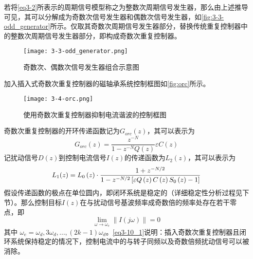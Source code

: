 \documentclass[
  lang=cn,
  degree=master,
  openany,oneside
]{nuaathesis}
\begin{document}
若将\autoref{eq3-2}所表示的周期信号模型称之为整数次周期信号发生器，那么由上述推导可见，其可以分解成为奇数次信号发生器和偶数次信号发生器，如\autoref{fig:3-3-odd_generator}所示。仅取其奇数次周期信号发生器部分，替换传统重复控制器中的整数次周期信号发生器部分，即构成奇数次重复控制器。
\begin{figure}
	\texttt{[image: 3-3-odd\_generator.png]}
	\caption{奇数次、偶数次信号发生器组合示意图}
	\label{fig:3-3-odd_generator}
\end{figure}
加入插入式奇数次重复控制器的磁轴承系统控制框图如\autoref{fig:orc}所示。
\begin{figure}[h!]
	\texttt{[image: 3-4-orc.png]}
	\caption{使用奇数次重复控制器抑制电流谐波的控制框图}
	\label{fig:orc}
\end{figure}
奇数次重复控制器的开环传递函数记为$G_{orc}(z)$，其可以表示为
\begin{equation}
G_{orc}(z)=\dfrac{z^{-N}}{1-z^{-N}Q(z)}\varepsilon C(z)
\end{equation}
记扰动信号$D(z)$到控制电流信号$I(z)$的传递函数为$L_2(z)$，其可以表示为
\begin{equation}
L_1(z)={L_0}\left( z \right) \cdot {{1 + {z^{ - N/2}}} \over {1 - {z^{ - N/2}}\left[ {\varepsilon Q\left( z \right)C\left( z \right){S_0}\left( z \right) - 1} \right]}}
\end{equation}
假设传递函数的极点在单位圆内，即闭环系统是稳定的（详细稳定性分析过程见下节）。那么控制目标$I(z)$在与扰动信号基波频率成奇数倍的频率处存在若干零点，即
\begin{equation}
\label{eq3-10_1}
\mathop {\lim }\limits_{\omega  \to {\omega _e}} \left\| {I\left( {j\omega } \right)} \right\| = 0
\end{equation}
其中 $\omega _e=\omega _d, 3\omega _d,...,(2k-1)\omega _d$。\autoref{eq3-10_1}说明：插入奇数次重复控制器且闭环系统保持稳定的情况下，控制电流中的与转子同频以及奇数倍频扰动信号可以被消除。
\end{document}
